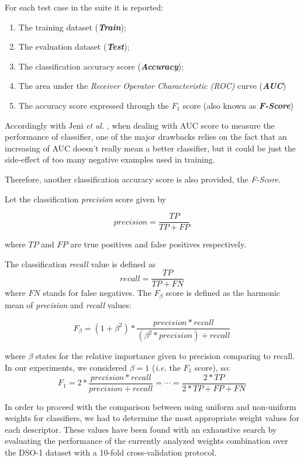 For each test case in the suite it is reported:
\begin{enumerate}
\item The training dataset (\textbf{\emph{Train}});
\item The evaluation dataset (\textbf{\emph{Test}});
\item The classification accuracy score (\textbf{\emph{Accuracy}});
\item The area under the \emph{Receiver Operator Characteristic (ROC)} curve (\textbf{\emph{AUC}})
\item The accuracy score expressed through the $F_1$ score (also known as \textbf{\emph{F-Score}})
\end{enumerate}

Accordingly with Jeni \emph{et al.} \cite{jeni2013facing}, when dealing with AUC score to measure the performance of classifier, one of the major drawbacks relies on the fact that an increasing of AUC doesn't really mean a better classifier, but it could be just the side-effect of too many negative examples used in training.

Therefore, another classification accuracy score is also provided, the \emph{F-Score}. 

Let the classification \emph{precision} score given by

$$
precision = \frac{TP}{TP + FP}
$$

where $TP$ and $FP$ are true positives and false positives respectively.

The classification \emph{recall} value is defined as
$$
recall = \frac{TP}{TP + FN}
$$
where $FN$ stands for false negatives. The $F_{\beta}$ score is defined as the harmonic mean of \emph{precision} and \emph{recall} values:

\begin{equation}
F_{\beta} = (1 + \beta^2) * \frac{precision * recall}{(\beta^2 * precision) + recall}
\end{equation}

where $\beta$ states for the relative importance given to precision comparing to recall. In our experiments, we considered $\beta = 1$ (\emph{i.e.} the $F_1$ score), so:
\begin{equation}
F_{1} = 2 * \frac{precision * recall}{precision + recall}  = \cdots = \frac{2 * TP}{2 * TP + FP + FN}
\end{equation}

In order to proceed with the comparison between using uniform and non-uniform weights for classifiers, we had to determine the most appropriate weight values for each descriptor. These values have been found with an exhaustive search by evaluating the performance of the currently analyzed weights combination over the DSO-1 dataset with a 10-fold cross-validation protocol. 

